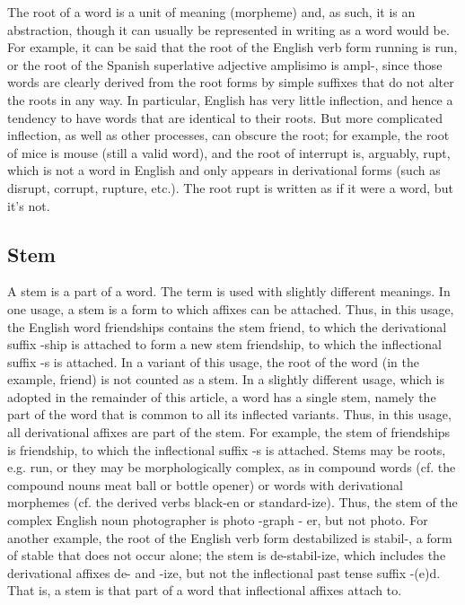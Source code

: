 The root of a word is a unit of meaning (morpheme) and, as such, it is an abstraction, though it can usually be represented in writing as a word would be. For example, it can be said that the root of the English verb form running is run, or the root of the Spanish superlative adjective amplisimo is ampl-, since those words are clearly derived from the root forms by simple suffixes that do not alter the roots in any way. In particular, English has very little inflection, and hence a tendency to have words that are identical to their roots. But more complicated inflection, as well as other processes, can obscure the root; for example, the root of mice is mouse (still a valid word), and the root of interrupt is, arguably, rupt, which is not a word in English and only appears in derivational forms (such as disrupt, corrupt, rupture, etc.). The root rupt is written as if it were a word, but it's not.

\subsection{Stem}
A stem is a part of a word. The term is used with slightly different meanings.
In one usage, a stem is a form to which affixes can be attached. Thus, in this usage, the English word friendships contains the stem friend, to which the derivational suffix -ship is attached to form a new stem friendship, to which the inflectional suffix -s is attached. In a variant of this usage, the root of the word (in the example, friend) is not counted as a stem.
In a slightly different usage, which is adopted in the remainder of this article, a word has a single stem, namely the part of the word that is common to all its inflected variants. Thus, in this usage, all derivational affixes are part of the stem. For example, the stem of friendships is friendship, to which the inflectional suffix -s is attached.
Stems may be roots, e.g. run, or they may be morphologically complex, as in compound words (cf. the compound nouns meat ball or bottle opener) or words with derivational morphemes (cf. the derived verbs black-en or standard-ize). Thus, the stem of the complex English noun photographer is photo -graph - er, but not photo. For another example, the root of the English verb form destabilized is stabil-, a form of stable that does not occur alone; the stem is de-stabil-ize, which includes the derivational affixes de- and -ize, but not the inflectional past tense suffix -(e)d. That is, a stem is that part of a word that inflectional affixes attach to.

